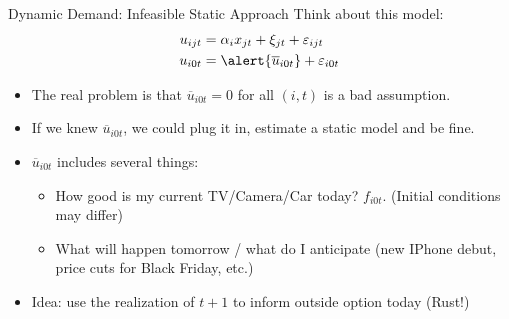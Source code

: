 \begin{frame}{Dynamic Demand: Infeasible Static Approach}
Think about this model:
\begin{align*}
u_{ijt} &=   \alpha_i x_{jt}  +  \xi_{jt} + \varepsilon_{ijt}\\
u_{i0t} &=  \alert{\overline{u}_{i0t}} + \varepsilon_{i0t} 
\end{align*}
\vspace{-0.5cm}
\begin{itemize}
\item The real problem is that $\overline{u}_{i0t}=0$ for all $(i,t)$ is a bad assumption.
\item If we knew $\overline{u}_{i0t}$, we could plug it in, estimate a static model and be fine.
\item $\overline{u}_{i0t}$ includes several things:
\begin{itemize}
	\item How good is my current TV/Camera/Car today? $f_{i0t}$. (Initial conditions may differ)
	\item What will happen tomorrow / what do I anticipate (new IPhone debut, price cuts for Black Friday, etc.)
\end{itemize}
\item \alert{Idea: use the realization of $t+1$ to inform outside option today (Rust!)}
\end{itemize}
\end{frame}

